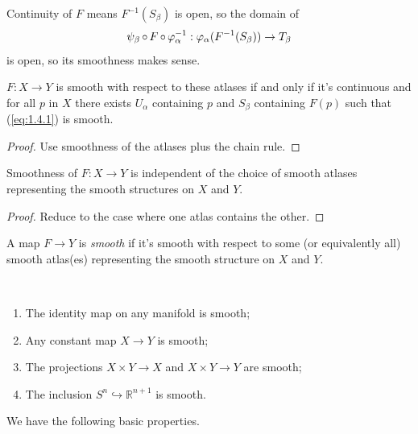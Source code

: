 \documentclass[a4paper,11pt]{article}
\begin{document}
	\begin{rmk}
		Continuity of $F$ means $F^{-1}(S_\beta)$ is open, so the domain of 
		\begin{equation}
			\psi_\beta \operatorname{\circ} F \operatorname{\circ} \varphi_\alpha^{-1} : \varphi_\alpha (F^{-1}(S_\beta)) \to T_\beta
			\label{eq:1.4.1}
		\end{equation}
		is open, so its smoothness makes sense.
	\end{rmk}

	\begin{lem}
		$F: X\to Y$ is smooth with respect to these atlases if and only if it's continuous and for all $p$ in $X$ there exists $U_\alpha$ containing $p$ and $S_\beta$ containing $F(p)$ such that (\ref{eq:1.4.1}) is smooth.
	\end{lem}
	\begin{proof}
		Use smoothness of the atlases plus the chain rule.
	\end{proof}

	\begin{cor}
		Smoothness of $F: X \to Y$ is independent of the choice of smooth atlases representing the smooth structures on $X$ and $Y$.
	\end{cor}
	\begin{proof}
		Reduce to the case where one atlas contains the other.
	\end{proof}

	\begin{defi}
		A map $F \to Y$ is \emph{smooth} if it's smooth with respect to some (or equivalently all) smooth atlas(es) representing the smooth structure on $X$ and $Y$.
	\end{defi}

	\begin{ex}
		\ 
		\begin{enumerate}
			\item The identity map on any manifold is smooth;
			\item Any constant map $X \to Y$ is smooth;
			\item The projections $X \times Y \to X$ and $X \times Y \to Y$ are smooth;
			\item The inclusion $S^n \hookrightarrow \mathbb{R}^{n+1}$ is smooth.
		\end{enumerate}
	\end{ex}

	We have the following basic properties.
\end{document}

